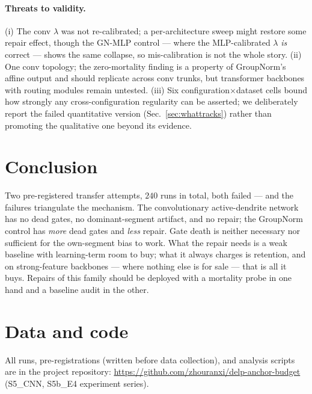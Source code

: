\documentclass[review]{elsarticle}
\begin{document}
\paragraph{Threats to validity.} (i) The conv $\lambda$ was not
re-calibrated; a per-architecture sweep might restore some repair
effect, though the GN-MLP control --- where the MLP-calibrated
$\lambda$ \emph{is} correct --- shows the same collapse, so
mis-calibration is not the whole story. (ii) One conv topology; the
zero-mortality finding is a property of GroupNorm's affine output and
should replicate across conv trunks, but transformer backbones with
routing modules remain untested. (iii) Six configuration$\times$dataset
cells bound how strongly any cross-configuration regularity can be
asserted; we deliberately report the failed quantitative version
(Sec.~\ref{sec:whattracks}) rather than promoting the qualitative one
beyond its evidence.

\section{Conclusion}

Two pre-registered transfer attempts, $240$ runs in total, both
failed --- and the failures triangulate the mechanism. The
convolutionary active-dendrite network has no dead gates, no
dominant-segment artifact, and no repair; the GroupNorm control has
\emph{more} dead gates and \emph{less} repair. Gate death is neither
necessary nor sufficient for the own-segment bias to work. What the
repair needs is a weak baseline with learning-term room to buy; what
it always charges is retention, and on strong-feature backbones ---
where nothing else is for sale --- that is all it buys. Repairs of
this family should be deployed with a mortality probe in one hand and
a baseline audit in the other.

\section*{Data and code}

All runs, pre-registrations (written before data collection), and
analysis scripts are in the project repository:
\url{https://github.com/zhouranxi/delp-anchor-budget}
(S5\_CNN, S5b\_E4 experiment series).



\end{document}
